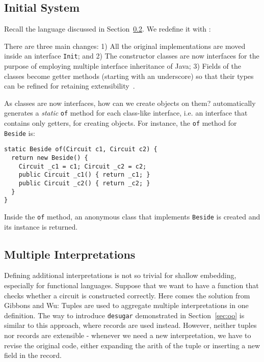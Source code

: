 \subsection{Initial System}
Recall the \dsl language discussed in Section~\ref{}.
We redefine it with \name:


There are three main changes:
1) All the original implementations are moved inside an interface \texttt{Init}; and
2) The constructor classes are now interfaces for the purpose of employing
multiple interface inheritance of Java;
3) Fields of the classes become getter methods (starting with an underscore) so that their types can be refined for retaining extensibility~\cite{eptrivially16}.

As classes are now interfaces, how can we create objects on them?
\name automatically generates a \emph{static} \texttt{of} method for each
class-like interface, i.e. an interface that contains only getters, for creating objects.
For instance, the \texttt{of} method for \texttt{Beside} is:
\begin{lstlisting}
static Beside of(Circuit c1, Circuit c2) {
  return new Beside() {
    Circuit _c1 = c1; Circuit _c2 = c2;
    public Circuit _c1() { return _c1; }
    public Circuit _c2() { return _c2; }
  }
}
\end{lstlisting}
Inside the \texttt{of} method, an anonymous class that implements
\texttt{Beside} is created and its instance is returned.

\subsection{Multiple Interpretations}
Defining additional interpretations is not so trivial for shallow embedding,
especially for functional languages.
Suppose that we want to have a function that checks whether a circuit is constructed correctly. Here comes the solution from Gibbons and Wu:
Tuples are used to aggregate multiple interpretations in one definition.
The way to introduce \texttt{desugar} demonstrated in Section~\ref{sec:oo} is similar to this
approach, where records are used instead.
However, neither tuples nor records are extensible - whenever we need a new
interpretation, we have to revise the original code, either expanding the arith of the
tuple or inserting a new field in the record.

